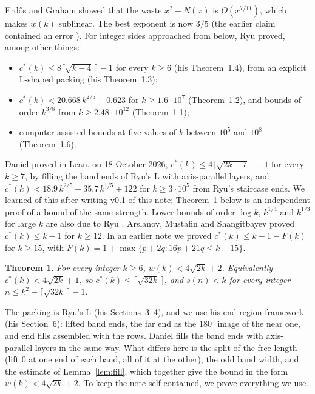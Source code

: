 \documentclass[11pt,letterpaper]{amsart}
\theoremstyle{plain}
\newtheorem{theorem}{Theorem}
\theoremstyle{remark}
\newcommand{\cs}{c^{*}}
\begin{document}
Erd\H{o}s and Graham \cite{EG75} showed that the waste $x^2-N(x)$ is $O(x^{7/11})$, which makes $w(k)$ sublinear. The best exponent is now $3/5$ \cite{Bui25,McC26} (the earlier claim \cite{CG20} contained an error \cite{AB26}). For integer sides approached from below, Ryu \cite{Ryu26} proved, among other things:
\begin{itemize}
\item $\cs(k)\le 8\lceil\sqrt{k-4}\,\rceil-1$ for every $k\ge6$ (his Theorem~1.4), from an explicit L-shaped packing (his Theorem~1.3);
\item $\cs(k)<20.668\,k^{2/5}+0.623$ for $k\ge1.6\cdot10^{7}$ (Theorem~1.2), and bounds of order $k^{3/8}$ from $k\ge2.48\cdot10^{12}$ (Theorem~1.1);
\item computer-assisted bounds at five values of $k$ between $10^5$ and $10^8$ (Theorem~1.6).
\end{itemize}
Daniel \cite{Dan26b} proved in Lean, on 18 October 2026, $\cs(k)\le4\lceil\sqrt{2k-7}\,\rceil-1$ for every $k\ge7$, by filling the band ends of Ryu's L with axis-parallel layers, and $\cs(k)<18.9\,k^{2/5}+35.7\,k^{1/5}+122$ for $k\ge3\cdot10^5$ from Ryu's staircase ends. We learned of this after writing v0.1 of this note; Theorem~\ref{thm:A} below is an independent proof of a bound of the same strength. Lower bounds of order $\log k$, $k^{1/4}$ and $k^{1/3}$ for large $k$ are also due to Ryu \cite{Ryu26b}. Arslanov, Mustafin and Shangitbayev \cite{AMS21} proved $\cs(k)\le k-1$ for $k\ge12$. In an earlier note \cite{Fan26a} we proved $\cs(k)\le k-1-F(k)$ for $k\ge15$, with $F(k)=1+\max\{p+2q:16p+21q\le k-15\}$.

\begin{theorem}\label{thm:A}
For every integer $k\ge6$, $w(k)<4\sqrt{2k}+2$. Equivalently $\cs(k)<4\sqrt{2k}+1$, so $\cs(k)\le\lceil\sqrt{32k}\,\rceil$, and $s(n)<k$ for every integer $n\le k^2-\lceil\sqrt{32k}\,\rceil-1$.
\end{theorem}

The packing is Ryu's L (his Sections~3--4), and we use his end-region framework (his Section~6): lifted band ends, the far end as the $180^\circ$ image of the near one, and end fills assembled with the rows. Daniel \cite{Dan26b} fills the band ends with axis-parallel layers in the same way. What differs here is the split of the free length (lift $0$ at one end of each band, all of it at the other), the odd band width, and the estimate of Lemma~\ref{lem:fill}, which together give the bound in the form $w(k)<4\sqrt{2k}+2$. To keep the note self-contained, we prove everything we use.
\end{document}
